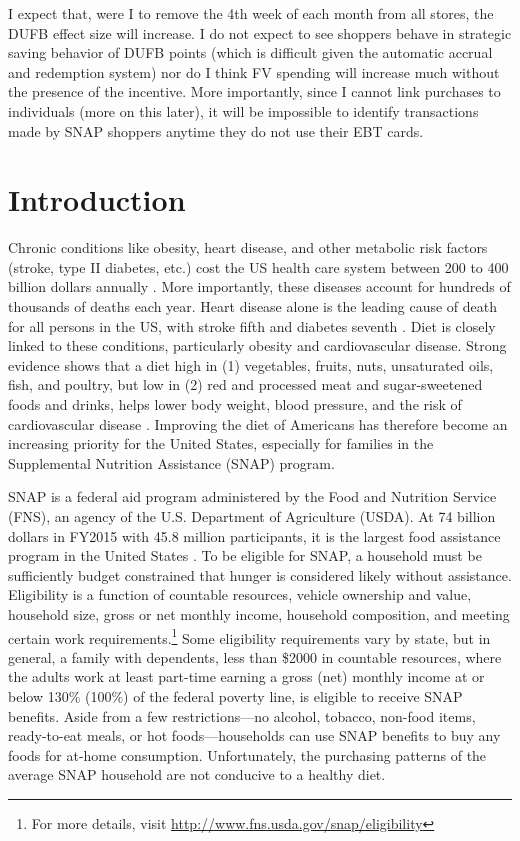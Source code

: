 \documentclass[12pt,letterpaperpaper,]{book}
\begin{document}
I expect that, were I to remove the 4th week of each month from all
stores, the DUFB effect size will increase. I do not expect to see
shoppers behave in strategic saving behavior of DUFB points (which is
difficult given the automatic accrual and redemption system) nor do I
think FV spending will increase much without the presence of the
incentive. More importantly, since I cannot link purchases to
individuals (more on this later), it will be impossible to identify
transactions made by SNAP shoppers anytime they do not use their EBT
cards.

\section*{Introduction}\label{intro-1}

Chronic conditions like obesity, heart disease, and other metabolic risk
factors (stroke, type II diabetes, etc.) cost the US health care system
between 200 to 400 billion dollars annually
\citep{cawley_medical_2012, chatterjee_checkup_2014}. More importantly,
these diseases account for hundreds of thousands of deaths each year.
Heart disease alone is the leading cause of death for all persons in the
US, with stroke fifth and diabetes seventh
\citep{national_center_for_health_statistics_health_2015}. Diet is
closely linked to these conditions, particularly obesity and
cardiovascular disease. Strong evidence shows that a diet high in (1)
vegetables, fruits, nuts, unsaturated oils, fish, and poultry, but low
in (2) red and processed meat and sugar-sweetened foods and drinks,
helps lower body weight, blood pressure, and the risk of cardiovascular
disease
\citep{mente_systematic_2009, nutrition_evidence_library_series_2014}.
Improving the diet of Americans has therefore become an increasing
priority for the United States, especially for families in the
Supplemental Nutrition Assistance (SNAP) program.

SNAP is a federal aid program administered by the Food and Nutrition
Service (FNS), an agency of the U.S. Department of Agriculture (USDA).
At 74 billion dollars in FY2015 with 45.8 million participants, it is
the largest food assistance program in the United States
\citep{usda_fns_supplemental_2016}. To be eligible for SNAP, a household
must be sufficiently budget constrained that hunger is considered likely
without assistance. Eligibility is a function of countable resources,
vehicle ownership and value, household size, gross or net monthly
income, household composition, and meeting certain work
requirements.\footnote{For more details, visit
  \url{http://www.fns.usda.gov/snap/eligibility}} Some eligibility
requirements vary by state, but in general, a family with dependents,
less than \$2000 in countable resources, where the adults work at least
part-time earning a gross (net) monthly income at or below 130\% (100\%)
of the federal poverty line, is eligible to receive SNAP benefits. Aside
from a few restrictions---no alcohol, tobacco, non-food items,
ready-to-eat meals, or hot foods---households can use SNAP benefits to
buy any foods for at-home consumption. Unfortunately, the purchasing
patterns of the average SNAP household are not conducive to a healthy
diet.
\end{document}
